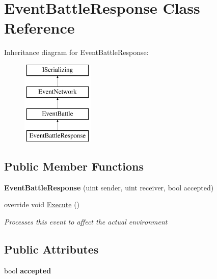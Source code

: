 \hypertarget{class_event_battle_response}{\section{Event\-Battle\-Response Class Reference}
\label{class_event_battle_response}
}
Inheritance diagram for Event\-Battle\-Response\-:\begin{figure}[H]
\begin{center}
\leavevmode
\includegraphics[height=4.000000cm]{class_event_battle_response}
\end{center}
\end{figure}
\subsection*{Public Member Functions}
\begin{DoxyCompactItemize}
\item 
\hypertarget{class_event_battle_response_a2ba1282fadb4d8f58e83b096971bb4ee}{{\bfseries Event\-Battle\-Response} (uint sender, uint receiver, bool accepted)}\label{class_event_battle_response_a2ba1282fadb4d8f58e83b096971bb4ee}

\item 
override void \hyperlink{class_event_battle_response_a3168ba71869e7eb77b6cd25165384ae8}{Execute} ()
\begin{DoxyCompactList}\small\item\em Processes this event to affect the actual environment \end{DoxyCompactList}\end{DoxyCompactItemize}
\subsection*{Public Attributes}
\begin{DoxyCompactItemize}
\item 
\hypertarget{class_event_battle_response_a43a2f73848037c9c3d67312ddadcac20}{bool {\bfseries accepted}}\label{class_event_battle_response_a43a2f73848037c9c3d67312ddadcac20}

\end{DoxyCompactItemize}
